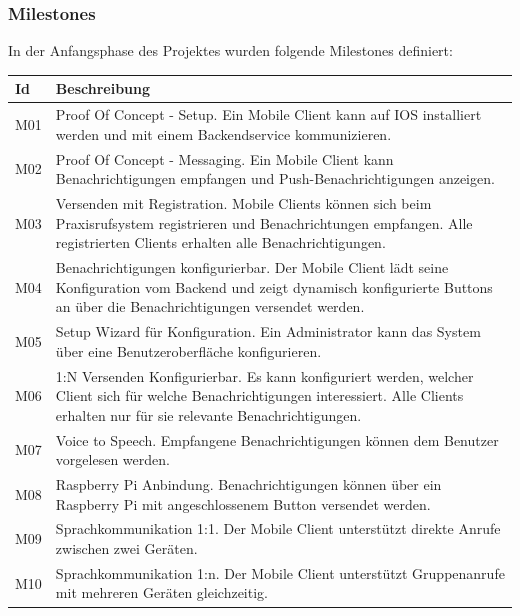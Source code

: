 \clearpage
\subsubsection*{Milestones}

In der Anfangsphase des Projektes wurden folgende Milestones definiert:

\begin{table}[h]
    \centering
    \begin{tabular}{|l|p{15cm}|}
        \hline
        \textbf{Id} & \textbf{Beschreibung}                                                                                                                                                                                         \\
        \hline
        M01         & Proof Of Concept - Setup. Ein Mobile Client kann auf IOS installiert werden und mit einem Backendservice kommunizieren. \\
        \hline
        M02         & Proof Of Concept - Messaging. Ein Mobile Client kann Benachrichtigungen empfangen und Push-Benachrichtigungen anzeigen. \\
        \hline
        M03         & Versenden mit Registration. Mobile Clients können sich beim Praxisrufsystem registrieren und Benachrichtungen empfangen. Alle registrierten Clients erhalten alle Benachrichtigungen. \\
        \hline
        M04         & Benachrichtigungen konfigurierbar. Der Mobile Client lädt seine Konfiguration vom Backend und zeigt dynamisch konfigurierte Buttons an über die Benachrichtigungen versendet werden.\\
        \hline
        M05         & Setup Wizard für Konfiguration. Ein Administrator kann das System über eine Benutzeroberfläche konfigurieren.  \\
        \hline
        M06         & 1:N Versenden Konfigurierbar. Es kann konfiguriert werden, welcher Client sich für welche Benachrichtigungen interessiert. Alle Clients erhalten nur für sie relevante Benachrichtigungen.  \\
        \hline
        M07         & Voice to Speech. Empfangene Benachrichtigungen können dem Benutzer vorgelesen werden. \\
        \hline
        M08         & Raspberry Pi Anbindung. Benachrichtigungen können über ein Raspberry Pi mit angeschlossenem Button versendet werden. \\
        \hline
        M09         & Sprachkommunikation 1:1. Der Mobile Client unterstützt direkte Anrufe zwischen zwei Geräten. \\
        \hline
        M10         & Sprachkommunikation 1:n. Der Mobile Client unterstützt Gruppenanrufe mit mehreren Geräten gleichzeitig. \\
        \hline
    \end{tabular}\label{tab:milestones}
\end{table}
\clearpage

